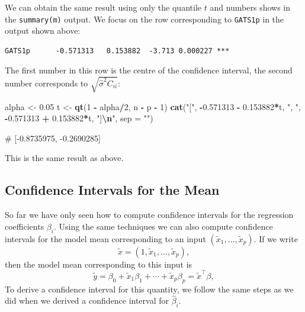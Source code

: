 \documentclass[
  a4paper,
]{article}
\newenvironment{Shaded}{\begin{snugshade}}{\end{snugshade}}
\newcommand{\AttributeTok}[1]{\textcolor[rgb]{0.13,0.29,0.53}{#1}}
\newcommand{\DecValTok}[1]{\textcolor[rgb]{0.00,0.00,0.81}{#1}}
\newcommand{\FloatTok}[1]{\textcolor[rgb]{0.00,0.00,0.81}{#1}}
\newcommand{\FunctionTok}[1]{\textcolor[rgb]{0.13,0.29,0.53}{\textbf{#1}}}
\newcommand{\NormalTok}[1]{#1}
\newcommand{\OtherTok}[1]{\textcolor[rgb]{0.56,0.35,0.01}{#1}}
\newcommand{\SpecialCharTok}[1]{\textcolor[rgb]{0.81,0.36,0.00}{\textbf{#1}}}
\newcommand{\StringTok}[1]{\textcolor[rgb]{0.31,0.60,0.02}{#1}}
\theoremstyle{definition}
\theoremstyle{definition}
\theoremstyle{definition}
\theoremstyle{definition}
\theoremstyle{remark}
\begin{document}
We can obtain the same result using only the quantile \(t\) and
numbers shows in the \texttt{summary(m)} output. We focus on the
row corresponding to \texttt{GATS1p} in the output shown above:

\begin{verbatim}
GATS1p      -0.571313   0.153882  -3.713 0.000227 ***
\end{verbatim}

The first number in this row is the centre of the confidence
interval, the second number corresponds to \(\sqrt{\hat\sigma^2 C_{ii}}\):

\begin{Shaded}
\begin{Highlighting}[]
\NormalTok{alpha }\OtherTok{\textless{}{-}} \FloatTok{0.05}
\NormalTok{t }\OtherTok{\textless{}{-}} \FunctionTok{qt}\NormalTok{(}\DecValTok{1} \SpecialCharTok{{-}}\NormalTok{ alpha}\SpecialCharTok{/}\DecValTok{2}\NormalTok{, n }\SpecialCharTok{{-}}\NormalTok{ p }\SpecialCharTok{{-}} \DecValTok{1}\NormalTok{)}
\FunctionTok{cat}\NormalTok{(}\StringTok{"["}\NormalTok{, }\SpecialCharTok{{-}}\FloatTok{0.571313} \SpecialCharTok{{-}} \FloatTok{0.153882}\SpecialCharTok{*}\NormalTok{t, }\StringTok{", "}\NormalTok{, }\SpecialCharTok{{-}}\FloatTok{0.571313} \SpecialCharTok{+} \FloatTok{0.153882}\SpecialCharTok{*}\NormalTok{t, }\StringTok{"]}\SpecialCharTok{\textbackslash{}n}\StringTok{"}\NormalTok{, }\AttributeTok{sep =} \StringTok{""}\NormalTok{)}
\end{Highlighting}
\end{Shaded}

\begin{Shaded}
\begin{Highlighting}[]
\NormalTok{\# [{-}0.8735975, {-}0.2690285]}
\end{Highlighting}
\end{Shaded}

This is the same result as above.

\subsection{Confidence Intervals for the Mean}\label{confidence-intervals-for-the-mean}

So far we have only seen how to compute confidence intervals for the
regression coefficients \(\beta_i\). Using the same techniques we can
also compute confidence intervals for the model mean corresponding
to an input \((\tilde x_1, \ldots, \tilde x_p)\). If we write
\begin{equation*}
  \tilde x = (1, \tilde x_1, \ldots, \tilde x_p),
\end{equation*}
then the model mean corresponding to this input is
\begin{equation*}
  \tilde y
  = \beta_0 + \tilde x_1 \beta_1 + \cdots + \tilde x_p \beta_p
  = \tilde x^\top \beta,
\end{equation*}
To derive a confidence interval for this quantity, we follow the same
steps as we did when we derived a confidence interval for \(\hat\beta_i\).
\end{document}

